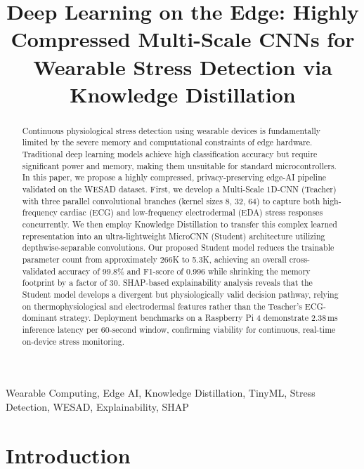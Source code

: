 \documentclass[conference]{IEEEtran}
\begin{document}
\title{Deep Learning on the Edge: Highly Compressed Multi-Scale CNNs for Wearable Stress Detection via Knowledge Distillation}

\author{
\and
{}
\IEEEauthorblockA{}
}

\maketitle

\begin{abstract}
Continuous physiological stress detection using wearable devices is fundamentally limited by the severe memory and computational constraints of edge hardware. Traditional deep learning models achieve high classification accuracy but require significant power and memory, making them unsuitable for standard microcontrollers. In this paper, we propose a highly compressed, privacy-preserving edge-AI pipeline validated on the WESAD dataset. First, we develop a Multi-Scale 1D-CNN (Teacher) with three parallel convolutional branches (kernel sizes 8, 32, 64) to capture both high-frequency cardiac (ECG) and low-frequency electrodermal (EDA) stress responses concurrently. We then employ Knowledge Distillation to transfer this complex learned representation into an ultra-lightweight MicroCNN (Student) architecture utilizing depthwise-separable convolutions. Our proposed Student model reduces the trainable parameter count from approximately 266K to 5.3K, achieving an overall cross-validated accuracy of 99.8\% and F1-score of 0.996 while shrinking the memory footprint by a factor of 30. SHAP-based explainability analysis reveals that the Student model develops a divergent but physiologically valid decision pathway, relying on thermophysiological and electrodermal features rather than the Teacher's ECG-dominant strategy. Deployment benchmarks on a Raspberry Pi 4 demonstrate 2.38\,ms inference latency per 60-second window, confirming viability for continuous, real-time on-device stress monitoring.
\end{abstract}

\begin{IEEEkeywords}
Wearable Computing, Edge AI, Knowledge Distillation, TinyML, Stress Detection, WESAD, Explainability, SHAP
\end{IEEEkeywords}

\section{Introduction}
\end{document}
